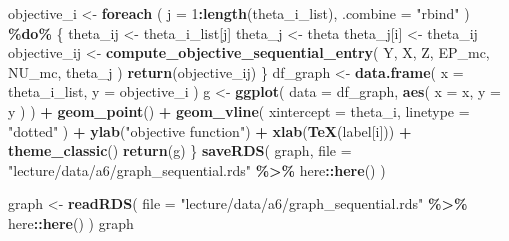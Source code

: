 \documentclass[
]{book}
\newenvironment{Shaded}{\begin{snugshade}}{\end{snugshade}}
\newcommand{\AttributeTok}[1]{\textcolor[rgb]{0.13,0.29,0.53}{#1}}
\newcommand{\DecValTok}[1]{\textcolor[rgb]{0.00,0.00,0.81}{#1}}
\newcommand{\FunctionTok}[1]{\textcolor[rgb]{0.13,0.29,0.53}{\textbf{#1}}}
\newcommand{\NormalTok}[1]{#1}
\newcommand{\OtherTok}[1]{\textcolor[rgb]{0.56,0.35,0.01}{#1}}
\newcommand{\SpecialCharTok}[1]{\textcolor[rgb]{0.81,0.36,0.00}{\textbf{#1}}}
\newcommand{\StringTok}[1]{\textcolor[rgb]{0.31,0.60,0.02}{#1}}
\begin{document}
\begin{Shaded}
\begin{Highlighting}[]
\NormalTok{  objective\_i }\OtherTok{\textless{}{-}} 
    \FunctionTok{foreach}\NormalTok{ (}
              \AttributeTok{j =} \DecValTok{1}\SpecialCharTok{:}\FunctionTok{length}\NormalTok{(theta\_i\_list),}
             \AttributeTok{.combine =} \StringTok{"rbind"}
\NormalTok{             ) }\SpecialCharTok{\%do\%}\NormalTok{ \{}
\NormalTok{               theta\_ij }\OtherTok{\textless{}{-}}\NormalTok{ theta\_i\_list[j]}
\NormalTok{               theta\_j }\OtherTok{\textless{}{-}}\NormalTok{ theta}
\NormalTok{               theta\_j[i] }\OtherTok{\textless{}{-}}\NormalTok{ theta\_ij}
\NormalTok{               objective\_ij }\OtherTok{\textless{}{-}} 
                 \FunctionTok{compute\_objective\_sequential\_entry}\NormalTok{(}
\NormalTok{                   Y, }
\NormalTok{                   X, }
\NormalTok{                   Z, }
\NormalTok{                   EP\_mc, }
\NormalTok{                   NU\_mc, }
\NormalTok{                   theta\_j}
\NormalTok{                   )}
               \FunctionTok{return}\NormalTok{(objective\_ij)}
\NormalTok{             \}}
\NormalTok{  df\_graph }\OtherTok{\textless{}{-}} 
    \FunctionTok{data.frame}\NormalTok{(}
      \AttributeTok{x =}\NormalTok{ theta\_i\_list, }
      \AttributeTok{y =}\NormalTok{ objective\_i}
\NormalTok{      ) }
\NormalTok{  g }\OtherTok{\textless{}{-}} 
    \FunctionTok{ggplot}\NormalTok{(}
      \AttributeTok{data =}\NormalTok{ df\_graph, }
      \FunctionTok{aes}\NormalTok{(}
        \AttributeTok{x =}\NormalTok{ x, }
        \AttributeTok{y =}\NormalTok{ y}
\NormalTok{        )}
\NormalTok{      ) }\SpecialCharTok{+} 
    \FunctionTok{geom\_point}\NormalTok{() }\SpecialCharTok{+}
    \FunctionTok{geom\_vline}\NormalTok{(}
      \AttributeTok{xintercept =}\NormalTok{ theta\_i, }
      \AttributeTok{linetype =} \StringTok{"dotted"}
\NormalTok{      ) }\SpecialCharTok{+}
    \FunctionTok{ylab}\NormalTok{(}\StringTok{"objective function"}\NormalTok{) }\SpecialCharTok{+} 
    \FunctionTok{xlab}\NormalTok{(}\FunctionTok{TeX}\NormalTok{(label[i])) }\SpecialCharTok{+} 
    \FunctionTok{theme\_classic}\NormalTok{()}
  \FunctionTok{return}\NormalTok{(g)}
\NormalTok{\}}
\FunctionTok{saveRDS}\NormalTok{(}
\NormalTok{  graph, }
  \AttributeTok{file =} \StringTok{"lecture/data/a6/graph\_sequential.rds"} \SpecialCharTok{\%\textgreater{}\%}\NormalTok{ here}\SpecialCharTok{::}\FunctionTok{here}\NormalTok{()}
\NormalTok{)}
\end{Highlighting}
\end{Shaded}

\begin{Shaded}
\begin{Highlighting}[]
\NormalTok{graph }\OtherTok{\textless{}{-}} \FunctionTok{readRDS}\NormalTok{(}
  \AttributeTok{file =} \StringTok{"lecture/data/a6/graph\_sequential.rds"} \SpecialCharTok{\%\textgreater{}\%}\NormalTok{ here}\SpecialCharTok{::}\FunctionTok{here}\NormalTok{()}
\NormalTok{)}
\NormalTok{graph}
\end{Highlighting}
\end{Shaded}
\end{document}
